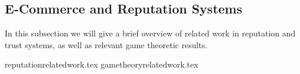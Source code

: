 \subsection{E-Commerce and Reputation Systems}
\label{sec:literaturereview:ecommerce}
  In this subsection we will give a brief overview of related work in reputation and trust
  systems, as well as relevant game theoretic results.

  {reputationrelatedwork.tex}
  {gametheoryrelatedwork.tex}
